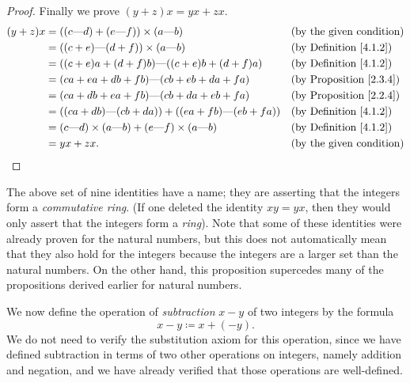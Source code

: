 \begin{proof}
    Finally we prove \((y + z)x = yx + zx\).
    \begin{align*}
        (y + z)x & = ((c \text{---} d) + (e \text{---} f)) \times (a \text{---} b)                       &  & \text{(by the given condition)}     \\
                 & = ((c + e) \text{---} (d + f)) \times (a \text{---} b)                                &  & \text{(by Definition \ref{4.1.2})}  \\
                 & = ((c + e)a + (d + f)b) \text{---} ((c + e)b + (d + f)a)                              &  & \text{(by Definition \ref{4.1.2})}  \\
                 & = (ca + ea + db + fb) \text{---} (cb + eb + da + fa)                                  &  & \text{(by Proposition \ref{2.3.4})} \\
                 & = (ca + db + ea + fb) \text{---} (cb + da + eb + fa)                                  &  & \text{(by Proposition \ref{2.2.4})} \\
                 & = ((ca + db) \text{---} (cb + da)) + ((ea + fb) \text{---} (eb + fa))                 &  & \text{(by Definition \ref{4.1.2})}  \\
                 & = (c \text{---} d) \times (a \text{---} b) + (e \text{---} f) \times (a \text{---} b) &  & \text{(by Definition \ref{4.1.2})}  \\
                 & = yx + zx.                                                                            &  & \text{(by the given condition)}
    \end{align*}
\end{proof}

\begin{remark}\label{4.1.7}
    The above set of nine identities have a name; they are asserting that the integers form a \emph{commutative ring}.
    (If one deleted the identity \(xy = yx\), then they would only assert that the integers form a \emph{ring}).
    Note that some of these identities were already proven for the natural numbers, but this does not automatically mean that they also hold for the integers because the integers are a larger set than the natural numbers.
    On the other hand, this proposition supercedes many of the propositions derived earlier for natural numbers.
\end{remark}

\begin{note}
    We now define the operation of \emph{subtraction} \(x - y\) of two integers by the formula
    \[
        x - y \coloneqq x + (-y).
    \]
    We do not need to verify the substitution axiom for this operation, since we have defined subtraction in terms of two other operations on integers, namely addition and negation, and we have already verified that those operations are well-defined.
\end{note}

